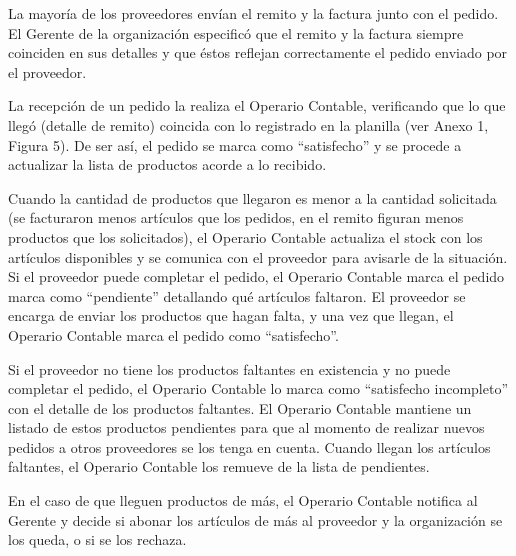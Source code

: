 \documentclass[12pt]{extarticle}
\begin{document}
\begin{spacing}{1.2}

    La mayoría de los proveedores envían el remito y la factura junto con el pedido. El Gerente de la organización especificó que el remito y la factura siempre coinciden en sus detalles y que éstos reflejan correctamente el pedido enviado por el proveedor. 
    
    La recepción de un pedido la realiza el Operario Contable, verificando que lo que llegó (detalle de remito) coincida con lo registrado en la planilla (ver Anexo 1, Figura 5). De ser así, el pedido se marca como ``satisfecho'' y se procede a actualizar la lista de productos acorde a lo recibido.

    Cuando la cantidad de productos que llegaron es menor a la cantidad solicitada (se facturaron menos artículos que los pedidos, en el remito figuran menos productos que los solicitados), el Operario Contable actualiza el stock con los artículos disponibles y se comunica con el proveedor para avisarle de la situación. Si el proveedor puede completar el pedido, el Operario Contable marca el pedido marca como ``pendiente'' detallando qué artículos faltaron. El proveedor se encarga de enviar los productos que hagan falta, y una vez que llegan, el Operario Contable marca el pedido como ``satisfecho''.  


    Si el proveedor no tiene los productos faltantes en existencia y no puede completar el pedido, el Operario Contable lo marca como ``satisfecho incompleto'' con el detalle de los productos faltantes. El Operario Contable  mantiene un listado de estos productos pendientes para que al momento de realizar nuevos pedidos a otros proveedores se los tenga en cuenta. Cuando llegan los artículos faltantes, el Operario Contable los remueve de la lista de pendientes.

    En el caso de que lleguen productos de más, el Operario Contable notifica al Gerente y decide si abonar los artículos de más al proveedor y la organización se los queda, o si se los rechaza.\\


\end{spacing}
\end{document}

